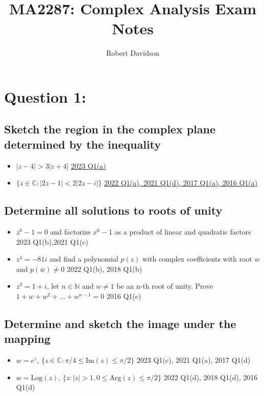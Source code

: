 \documentclass[a4paper, 8pt]{extarticle}
\title{
\textbf{MA2287: Complex Analysis Exam Notes} \\ 
}
\author{
  Robert Davidson
}
\date{} %
\begin{document}
\maketitle
\pagebreak
\tableofcontents
\pagebreak


\section{Question 1: }
\subsection{Sketch the region in the complex plane determined by the inequality}
\begin{itemize}
    \item $|z - 4| > 3|z+4|$ \hfill \hyperref[sol:2023Q1a]{\uline{2023 Q1(a)}}
    \item $\{ z \in \mathbb{C} : |2z - 1| < 2|2z-i|$\} \hfill  \hyperref[sol:2022Q1a]{\uline{2022 Q1(a), 2021 Q1(d), 2017 Q1(a), 2016 Q1(a)}}
\end{itemize}
\subsection{Determine all solutions to roots of unity}
\begin{itemize}
    \item $z^6 -1 = 0$ and factorize $x^6 -1$ as a product of linear and quadratic factors \hfill 2023 Q1(b),2021 Q1(c)
    \item $z^4 = -81i$ and find a polynomial $p(z)$ with complex coefficients with root $w$ and $p(\overline{w}) \neq 0$ \hfill 2022 Q1(b), 2018 Q1(b)
    \item $z^3 = 1+i$, let $n \in \mathbb{N}$ and $w \neq 1$ be an n-th root of unity. Prove $1 + w + w^2 + \ldots + w^{n-1} = 0$ \hfill 2016 Q1(c)
\end{itemize}
\subsection{Determine and sketch the image under the mapping}
\begin{itemize}
    \item $w = e^z$, $\{z \in \mathbb{C} : \pi / 4 \leq \text{Im}(z) \leq \pi /2\}$ \hfill 2023 Q1(c), 2021 Q1(a), 2017 Q1(d)
    \item $w = \text{Log}(z)$, $\{z: |z| > 1, 0 \leq \text{Arg}(z) \leq \pi / 2\}$ \hfill 2022 Q1(d), 2018 Q1(d), 2016 Q1(d)
\end{itemize}
\end{document}
